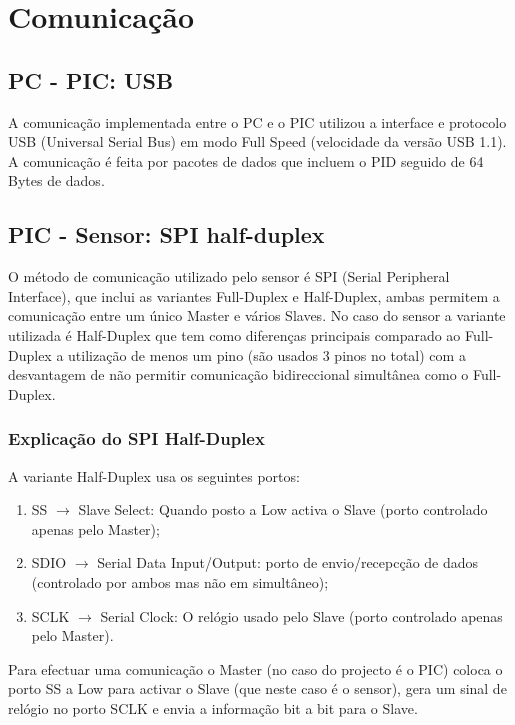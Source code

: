 \documentclass[a4paper]{article}
\begin{document}


\tableofcontents
\pagebreak

\section{Comunicação}
\label{sec:comunicacao}

\subsection{PC - PIC: USB}
A comunicação implementada entre o PC e o PIC utilizou a interface e protocolo USB (Universal Serial Bus) em modo Full Speed (velocidade da versão USB 1.1).
A comunicação é feita por pacotes de dados que incluem o PID seguido de 64 Bytes de dados.   

\subsection{PIC - Sensor: SPI half-duplex}
O método de comunicação utilizado pelo sensor é SPI (Serial Peripheral Interface), que inclui as variantes Full-Duplex e Half-Duplex, ambas permitem a comunicação entre um único Master e vários Slaves.
No caso do sensor a variante utilizada é Half-Duplex que tem como diferenças principais comparado ao Full-Duplex a utilização de menos um pino (são usados 3 pinos no total) com a desvantagem de não permitir comunicação bidireccional simultânea como o Full-Duplex.

\subsubsection{Explicação do SPI Half-Duplex}  
A variante Half-Duplex usa os seguintes portos:
\begin{enumerate}
	\item SS $\rightarrow$ Slave Select: Quando posto a Low activa o Slave (porto controlado apenas pelo Master);
	\item SDIO $\rightarrow$ Serial Data Input/Output: porto de envio/recepcção de dados (controlado por ambos mas não em simultâneo);
	\item SCLK $\rightarrow$ Serial Clock: O relógio usado pelo Slave (porto controlado apenas pelo Master).
\end{enumerate}

Para efectuar uma comunicação o Master (no caso do projecto é o PIC) coloca o porto SS a Low para activar o Slave (que neste caso é o sensor), gera um sinal de relógio no porto SCLK e envia a informação bit a bit para o Slave.
\end{document}
